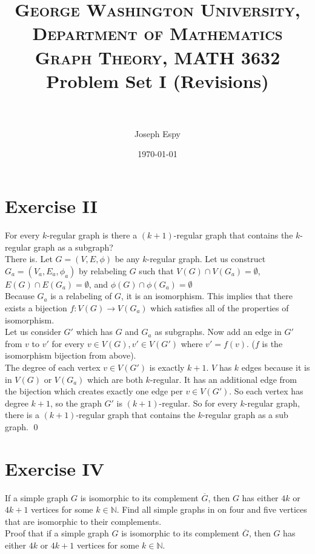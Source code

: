 \documentclass[fontsize=11pt]{scrartcl} %
\title{	
\normalfont \normalsize 
\textsc{George Washington University, Department of Mathematics} \\ [25pt] %
\textsc{Graph Theory, MATH 3632}
\horrule{0.5pt} \\[0.4cm] %
\huge Problem Set I (Revisions)\\ %
\horrule{2pt} \\[0.5cm] %
}
\author{Joseph Espy} %
\date{\normalsize\today} %
\numberwithin{equation}{section} %
\numberwithin{figure}{section} %
\numberwithin{table}{section} %
\begin{document}
\maketitle %

\section*{Exercise II}
	For every $k$-regular graph is there a $(k+1)$-regular graph that contains the $k$-regular graph as a subgraph?\\
	
	There is.  Let $G= (V, E, \phi)$ be any $k$-regular graph.  Let us construct $G_a = (V_a, E_a, \phi_a)$ by relabeling $G$ such that $V(G) \cap V(G_a) = \emptyset$, $E(G) \cap E(G_a) = \emptyset$, and $\phi(G) \cap \phi(G_a) = \emptyset$\\
	
	Because $G_a$ is a relabeling of $G$, it is an isomorphism.  This implies that there exists a bijection $f: V(G)\rightarrow V(G_a)$ which satisfies all of the properties of isomorphism.  \\
	
	Let us consider $G'$ which has $G$ and $G_a$ as subgraphs.  Now add an edge in $G'$ from $v$ to $v'$ for every $v \in V(G), v' \in V(G')$ where $v' = f(v)$.  ($f$ is the isomorphism bijection from above).  \\
	
	The degree of each vertex $v \in V(G')$ is exactly $k+1$.  $V$ has $k$ edges because it is in $V(G)$ or $V(G_a)$ which are both $k$-regular.  It has an additional edge from the bijection which creates exactly one edge per $v \in V(G')$.  So each vertex has degree $k+1$, so the graph $G'$ is $(k+1)$-regular.  So for every $k$-regular graph, there is a $(k+1)$-regular graph that contains the $k$-regular graph as a sub graph.  \qed


\section*{Exercise IV}
			If a simple graph $G$ is isomorphic to its complement $\overline G$, then $G$ has either $4k$ or $4k+1$ vertices for some $k \in \mathbb{N}$.  Find all simple graphs in on four and five vertices that are isomorphic to their complements.\\
			
			Proof that if a simple graph $G$ is isomorphic to its complement $\overline G$, then $G$ has either $4k$ or $4k+1$ vertices for some $k \in \mathbb{N}$.\\
			
\end{document}
